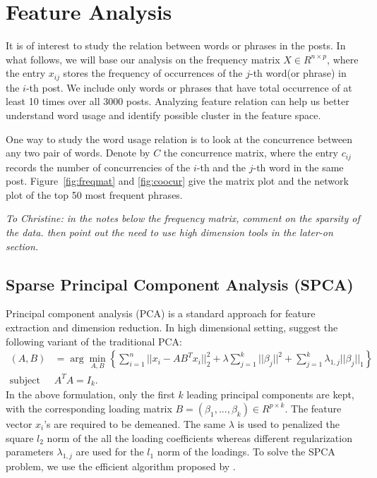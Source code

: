\documentclass[11pt]{article}
\newcommand{\note}[1]{{\em \color{red} #1}}
\newcommand{\1}[1]{{\mathbf 1}\left\{#1\right\}}        %
\begin{document}
\section{Feature Analysis}
It is of interest to study the relation between words or phrases in the posts. In what follows, we will base our analysis on the frequency matrix $X\in R^{n\times p}$, where the entry $x_{ij}$ stores the frequency of occurrences of the $j$-th word(or phrase) in the $i$-th post. We include only words or phrases that have total occurrence of at least 10 times over all 3000 posts. Analyzing feature relation can help us better understand word usage and identify possible cluster in the feature space. 



One way to study the word usage relation is to look at the concurrence between any two pair of words. Denote by $C$ the concurrence matrix, where the entry $c_{ij}$ records the number of concurrencies of the $i$-th and the $j$-th word in the same post. Figure~\ref{fig:freqmat} and \ref{fig:coocur} give the matrix plot and the network plot of the top 50 most frequent phrases. 

\note{ 
To Christine: in the notes below the frequency matrix, comment on the sparsity of the data. then point out the need to use high dimension tools in the later-on section.
}


\subsection{Sparse Principal Component Analysis (SPCA)}
Principal component analysis (PCA) is a standard approach for feature extraction and dimension reduction. In high dimensional setting, \cite{zou2006sparse} suggest the following variant of the traditional PCA:
\begin{align}
(A,B) & = \arg \min_{A,B} \left \{ \sum_{i=1}^n||x_i-AB^Tx_i||_2^2 + \lambda \sum_{j=1}^k||\beta_j||^2 + \sum_{j=1}^k\lambda_{1,j}||\beta_j||_1 \right\} \\ 
\text{subject to } & A^TA = I_{k}. \nonumber
\end{align}
In the above formulation, only the first $k$ leading principal components are kept, with the corresponding loading matrix $B = (\beta_1,...,\beta_k) \in R^{p\times k}$. The feature vector $x_i$'s are required to be demeaned. The same $\lambda$ is used to penalized the square $l_2$ norm of the all the loading coefficients whereas different regularization parameters $\lambda_{1,j}$ are used for the $l_1$ norm of the loadings. To solve the SPCA problem, we use the efficient algorithm proposed by \cite{zou2006sparse}. 
\end{document}
